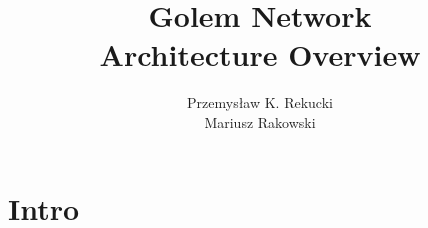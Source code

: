 \documentclass[12pt]{article}
\author{Przemysław K. Rekucki \\ Mariusz Rakowski}
\title{Golem Network \\ Architecture Overview}
\begin{document}
\maketitle{}

\section{Intro}
\end{document}
